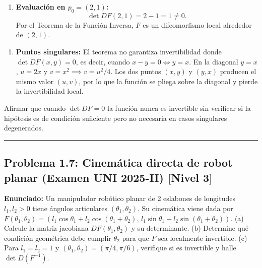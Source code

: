 \documentclass[11pt,a4paper]{article}
\begin{document}
\begin{enumerate}[label=\textbf{\arabic*.}]
\item \textbf{Evaluación en $p_0 = (2,1)$:}
\begin{equation*}
\det DF(2,1) = 2 - 1 = 1 \neq 0.
\end{equation*}
Por el Teorema de la Función Inversa, $F$ es un difeomorfismo local alrededor de $(2,1)$.
\end{enumerate}

\begin{enumerate}[label=\textbf{\arabic*.}]
\item \textbf{Puntos singulares:}
El teorema no garantiza invertibilidad donde $\det DF(x,y) = 0$, es decir, cuando $x - y = 0 \iff y = x$.
En la diagonal $y = x$, $u = 2x$ y $v = x^2 \implies v = u^2 / 4$. Los dos puntos $(x,y)$ y $(y,x)$ producen el mismo valor $(u,v)$, por lo que la función se pliega sobre la diagonal y pierde la invertibilidad local.
\end{enumerate}

\begin{trapbox}
Afirmar que cuando $\det DF = 0$ la función nunca es invertible sin verificar si la hipótesis es de condición suficiente pero no necesaria en casos singulares degenerados.
\end{trapbox}

\vspace{0.5cm}
\hrule
\vspace{0.5cm}

\subsection*{Problema 1.7: Cinemática directa de robot planar (Examen UNI 2025-II) \hfill \color{primaryblue}\small[Nivel 3]}

\begin{tcolorbox}[colback=white,colframe=gray!40,arc=1mm,boxrule=0.5pt,left=3mm,right=3mm,top=2mm,bottom=2mm]
\textbf{Enunciado:} Un manipulador robótico planar de 2 eslabones de longitudes $l_1, l_2 > 0$ tiene ángulos articulares $(\theta_1, \theta_2)$. Su cinemática viene dada por $F(\theta_1, \theta_2) = (l_1\cos\theta_1 + l_2\cos(\theta_1+\theta_2), \, l_1\sin\theta_1 + l_2\sin(\theta_1+\theta_2))$. (a) Calcule la matriz jacobiana $DF(\theta_1, \theta_2)$ y su determinante. (b) Determine qué condición geométrica debe cumplir $\theta_2$ para que $F$ sea localmente invertible. (c) Para $l_1 = l_2 = 1$ y $(\theta_1, \theta_2) = (\pi/4, \pi/6)$, verifique si es invertible y halle $\det D(F^{-1})$.
\end{tcolorbox}
\end{document}
